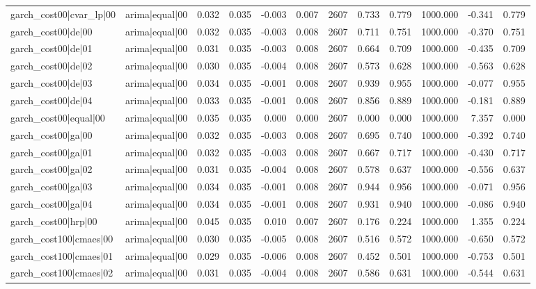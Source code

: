 \begin{table}
\begin{tabular}{llrrrrrrrrrr}
garch\_cost00|cvar\_lp|00 & arima|equal|00 & 0.032 & 0.035 & -0.003 & 0.007 & 2607 & 0.733 & 0.779 & 1000.000 & -0.341 & 0.779 \\
garch\_cost00|de|00 & arima|equal|00 & 0.032 & 0.035 & -0.003 & 0.008 & 2607 & 0.711 & 0.751 & 1000.000 & -0.370 & 0.751 \\
garch\_cost00|de|01 & arima|equal|00 & 0.031 & 0.035 & -0.003 & 0.008 & 2607 & 0.664 & 0.709 & 1000.000 & -0.435 & 0.709 \\
garch\_cost00|de|02 & arima|equal|00 & 0.030 & 0.035 & -0.004 & 0.008 & 2607 & 0.573 & 0.628 & 1000.000 & -0.563 & 0.628 \\
garch\_cost00|de|03 & arima|equal|00 & 0.034 & 0.035 & -0.001 & 0.008 & 2607 & 0.939 & 0.955 & 1000.000 & -0.077 & 0.955 \\
garch\_cost00|de|04 & arima|equal|00 & 0.033 & 0.035 & -0.001 & 0.008 & 2607 & 0.856 & 0.889 & 1000.000 & -0.181 & 0.889 \\
garch\_cost00|equal|00 & arima|equal|00 & 0.035 & 0.035 & 0.000 & 0.000 & 2607 & 0.000 & 0.000 & 1000.000 & 7.357 & 0.000 \\
garch\_cost00|ga|00 & arima|equal|00 & 0.032 & 0.035 & -0.003 & 0.008 & 2607 & 0.695 & 0.740 & 1000.000 & -0.392 & 0.740 \\
garch\_cost00|ga|01 & arima|equal|00 & 0.032 & 0.035 & -0.003 & 0.008 & 2607 & 0.667 & 0.717 & 1000.000 & -0.430 & 0.717 \\
garch\_cost00|ga|02 & arima|equal|00 & 0.031 & 0.035 & -0.004 & 0.008 & 2607 & 0.578 & 0.637 & 1000.000 & -0.556 & 0.637 \\
garch\_cost00|ga|03 & arima|equal|00 & 0.034 & 0.035 & -0.001 & 0.008 & 2607 & 0.944 & 0.956 & 1000.000 & -0.071 & 0.956 \\
garch\_cost00|ga|04 & arima|equal|00 & 0.034 & 0.035 & -0.001 & 0.008 & 2607 & 0.931 & 0.940 & 1000.000 & -0.086 & 0.940 \\
garch\_cost00|hrp|00 & arima|equal|00 & 0.045 & 0.035 & 0.010 & 0.007 & 2607 & 0.176 & 0.224 & 1000.000 & 1.355 & 0.224 \\
garch\_cost100|cmaes|00 & arima|equal|00 & 0.030 & 0.035 & -0.005 & 0.008 & 2607 & 0.516 & 0.572 & 1000.000 & -0.650 & 0.572 \\
garch\_cost100|cmaes|01 & arima|equal|00 & 0.029 & 0.035 & -0.006 & 0.008 & 2607 & 0.452 & 0.501 & 1000.000 & -0.753 & 0.501 \\
garch\_cost100|cmaes|02 & arima|equal|00 & 0.031 & 0.035 & -0.004 & 0.008 & 2607 & 0.586 & 0.631 & 1000.000 & -0.544 & 0.631 \\

\end{tabular}
\end{table}
